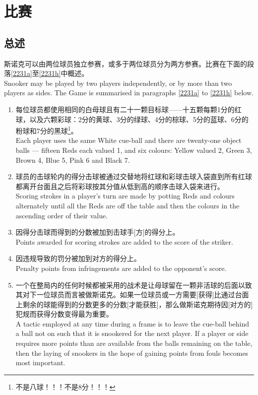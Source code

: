 \section{比赛}\label{223}

\subsection{总述}\label{2231}

\noindent 斯诺克可以由两位球员独立参赛，或多于两位球员分为两方参赛。比赛在下面的段落\ref{2231a}至\ref{2231h}中概述。\\
Snooker may be played by two players independently, or by more than two players as sides. The Game is summarised in paragraphs \ref{2231a} to \ref{2231h} below.
\begin{enumerate}[label=(\alph*)]
    \item \label{2231a}每位球员都使用相同的白母球且有二十一颗目标球——十五颗每颗1分的红球，以及六颗彩球：2分的黄球、3分的绿球、4分的棕球、5分的蓝球、6分的粉球和7分的黑球\footnote{不是八球！！！不是8分！！！}。\\
    Each player uses the same White cue-ball and there are twenty-one object balls --- fifteen Reds each valued 1, and six colours: Yellow valued 2, Green 3, Brown 4, Blue 5, Pink 6 and Black 7.
    \item 球员的击球轮内的得分击球被通过交替地将红球和彩球击球入袋直到所有红球都离开台面且之后将彩球按其分值从低到高的顺序击球入袋来进行。\\
    Scoring strokes in a player's turn are made by potting Reds and colours alternately until all the Reds are off the table and then the colours in the ascending order of their value.
    \item 因得分击球而得到的分数被加到击球手[方]的得分上。\\
    Points awarded for scoring strokes are added to the score of the striker.
    \item 因违规导致的罚分被加到对方的得分上。\\
    Penalty points from infringements are added to the opponent's score.
    \item 一个在整局内的任何时候都被采用的战术是让母球留在一颗非活球的后面以致其对下一位球员而言被做斯诺克。如果一位球员或一方需要[获得]比通过台面上剩余的球能得到的分数更多的分数[才能获胜]，那么做斯诺克期待因[对方的]犯规而获得分数变得最为重要。\\
    A tactic employed at any time during a frame is to leave the cue-ball behind a ball not on such that it is snookered for the next player. If a player or side requires more points than are available from the balls remaining on the table, then the laying of snookers in the hope of gaining points from fouls becomes most important.

\end{enumerate}
